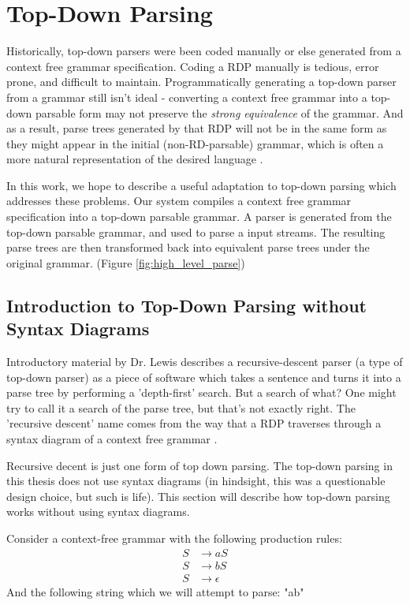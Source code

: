 \documentclass[11pt]{article}
\begin{document}
\section{Top-Down Parsing}
Historically, top-down parsers were been coded manually or else generated from 
a context free grammar specification. \cite{lewis, formal_langs} 
Coding a RDP manually is tedious, error prone, and difficult to maintain.
Programmatically generating a top-down parser from a grammar
still isn't ideal - converting a context free grammar into
a top-down parsable form may not preserve the {\em strong equivalence} of the grammar.
And as a result, parse trees generated by that RDP will not be in the same form
as they might appear in the initial (non-RD-parsable) grammar, which is often a more 
natural representation of the desired language \cite{compiler}.

In this work, we hope to describe a useful adaptation to top-down parsing
which addresses these problems. Our system compiles a context free grammar 
specification into a top-down parsable grammar.
A parser is generated from the top-down parsable grammar,
and used to parse a input streams. 
The resulting parse trees are then transformed back into equivalent
parse trees under the original grammar. (Figure \ref{fig:high_level_parse})

\subsection{Introduction to Top-Down Parsing without Syntax Diagrams}
\label{rd_wo_sd}
Introductory material by Dr. Lewis \cite{lewis} describes a recursive-descent parser (a type of top-down parser)
as a piece of software which takes a sentence and turns it into a parse tree by performing a 'depth-first' search. 
But a search of what? One might try to call it a search of the parse tree, but that's not exactly right.
The 'recursive descent' name comes from the way that a RDP traverses through a
syntax diagram of a context free grammar \cite{compiler}.

Recursive decent is just one form of top down parsing. The top-down parsing in this thesis
does not use syntax diagrams (in hindsight, this was a questionable design choice, 
but such is life). This section will describe how top-down parsing works without
using syntax diagrams.

Consider a context-free grammar with the following production rules:
\setcounter{equation}{0}
\begin{align}
S &\rightarrow a S\\
S &\rightarrow b S\\
S &\rightarrow \epsilon
\end{align}
And the following string which we will attempt to parse: "ab"
\end{document}
